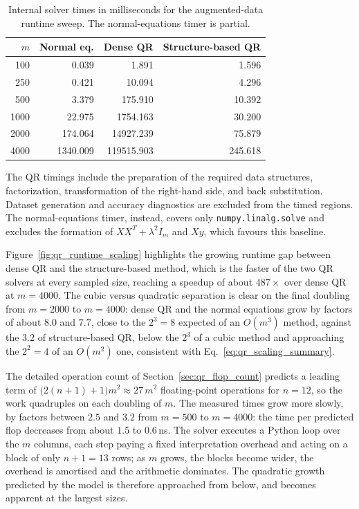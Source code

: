 \begin{table}[H]
\centering
\caption{Internal solver times in milliseconds for the augmented-data runtime
sweep. The normal-equations timer is partial.}
\label{tab:qr_runtime_scaling}
\small
\setlength{\tabcolsep}{8pt}
\begin{tabular}{rrrr}
    \toprule
    $m$ & \textbf{Normal eq.} & \textbf{Dense QR}
        & \textbf{Structure-based QR}\\
    \midrule
     100 &    0.039 &      1.891 &   1.596\\
     250 &    0.421 &     10.094 &   4.296\\
     500 &    3.379 &    175.910 &  10.392\\
    1000 &   22.975 &   1754.163 &  30.200\\
    2000 &  174.064 &  14927.239 &  75.879\\
    4000 & 1340.009 & 119515.903 & 245.618\\
    \bottomrule
\end{tabular}
\end{table}

\noindent The QR timings include the preparation of the required data structures, factorization, transformation of the right-hand side, and back substitution. Dataset generation and accuracy diagnostics are excluded from the timed regions. The normal-equations timer, instead, covers only \texttt{numpy.linalg.solve}
and excludes the formation of $XX^T+\lambda^2I_m$ and $Xy$, which favours
this baseline.

\noindent Figure~\ref{fig:qr_runtime_scaling} highlights the growing runtime
gap between dense QR and the structure-based method, which is the faster of
the two QR solvers at every sampled size, reaching a speedup of about
$487\times$ over dense QR at $m=4000$. The cubic versus quadratic separation
is clear on the final doubling from $m=2000$ to $m=4000$: dense QR and the
normal equations grow by factors of about $8.0$ and $7.7$, close to the
$2^3=8$ expected of an $O(m^3)$ method, against the $3.2$ of structure-based
QR, below the $2^3$ of a cubic method and approaching the $2^2=4$ of an
$O(m^2)$ one, consistent with Eq.~\eqref{eq:qr_scaling_summary}.

\noindent The detailed operation count of Section~\ref{sec:qr_flop_count}
predicts a leading term of $\bigl(2(n+1)+1\bigr)m^2 \approx 27\,m^2$
floating-point operations for $n=12$, so the work quadruples on each doubling
of $m$. The measured times grow more slowly, by factors between $2.5$ and
$3.2$ from $m=500$ to $m=4000$: the time per predicted flop decreases from
about $1.5$ to $0.6$\,ns. The solver executes a Python loop over the $m$
columns, each step paying a fixed interpretation overhead and acting on a
block of only $n+1=13$ rows; as $m$ grows, the blocks become wider, the
overhead is amortised and the arithmetic dominates. The quadratic growth
predicted by the model is therefore approached from below, and becomes
apparent at the largest sizes.

